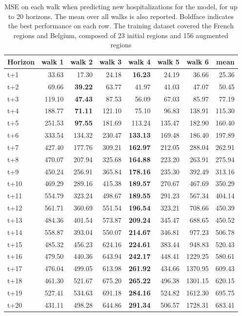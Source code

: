 \begin{table}[H]
\centering
\caption{MSE on each walk when predicting new hospitalizations for the model, for up to 20 horizons. The mean over all walks is also reported. Boldface indicates the best performance on each row. The training dataset covered the French regions and Belgium, composed of 23 initial regions and 156 augmented regions }
\label{tab:MSE_walk_dense_model}
\begin{tabular}{lrrrrrrr}
\toprule
Horizon &  walk 1 &  walk 2 &  walk 3 &  walk 4 &  walk 5 &  walk 6 &   mean \\
\midrule
t+1  & 33.63  & 17.30  & 24.18  & \textbf{16.23}  & 24.19  & 36.66  & 25.36  \\
t+2  & 69.66  & \textbf{39.22}  & 63.77  & 41.97  & 41.03  & 47.07  & 50.45  \\
t+3  & 119.10  & \textbf{47.43}  & 87.53  & 56.09  & 67.03  & 85.97  & 77.19  \\
t+4  & 188.77  & \textbf{71.11}  & 121.10  & 75.10  & 96.83  & 138.91  & 115.30  \\
t+5  & 251.53  & \textbf{97.55}  & 181.69  & 113.24  & 135.47  & 182.90  & 160.40  \\
t+6  & 333.54  & 134.32  & 230.47  & \textbf{133.13}  & 169.48  & 186.40  & 197.89  \\
t+7  & 427.40  & 177.76  & 309.21  & \textbf{162.97}  & 212.05  & 288.04  & 262.91  \\
t+8  & 470.07  & 207.94  & 325.68  & \textbf{164.88}  & 223.20  & 263.91  & 275.94  \\
t+9  & 450.24  & 256.91  & 365.84  & \textbf{178.16}  & 235.30  & 392.49  & 313.16  \\
t+10  & 469.29  & 289.16  & 415.38  & \textbf{189.57}  & 270.67  & 467.69  & 350.29  \\
t+11  & 554.79  & 323.24  & 498.67  & \textbf{189.55}  & 291.23  & 567.34  & 404.14  \\
t+12  & 561.71  & 360.69  & 551.54  & \textbf{196.54}  & 323.21  & 708.66  & 450.39  \\
t+13  & 484.36  & 401.54  & 573.87  & \textbf{209.24}  & 345.47  & 688.65  & 450.52  \\
t+14  & 558.87  & 393.04  & 550.07  & \textbf{214.67}  & 346.81  & 977.23  & 506.78  \\
t+15  & 485.32  & 456.23  & 624.16  & \textbf{224.61}  & 383.44  & 948.83  & 520.43  \\
t+16  & 479.50  & 440.36  & 643.94  & \textbf{242.17}  & 448.41  & 1229.25  & 580.61  \\
t+17  & 476.04  & 499.05  & 613.98  & \textbf{261.92}  & 434.66  & 1370.95  & 609.43  \\
t+18  & 461.30  & 521.67  & 675.20  & \textbf{265.22}  & 496.38  & 1301.15  & 620.15  \\
t+19  & 527.41  & 534.63  & 691.18  & \textbf{284.16}  & 524.82  & 1612.30  & 695.75  \\
t+20  & 431.11  & 498.28  & 644.86  & \textbf{291.34}  & 506.57  & 1728.31  & 683.41  \\

\bottomrule
\end{tabular}
\end{table}
